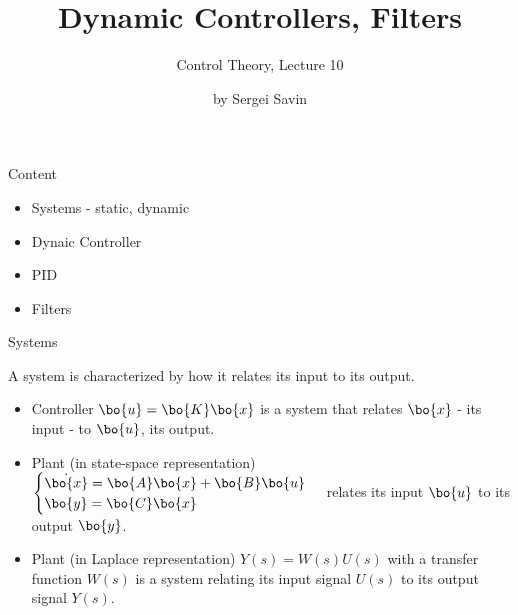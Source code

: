 \documentclass{beamer}
\title{Dynamic Controllers, Filters}
\subtitle{Control Theory, Lecture 10}
\author{by Sergei Savin}
\date{\mydate}
\begin{document}
\maketitle



\begin{frame}{Content}
\begin{itemize}
\item Systems - static, dynamic
\item Dynaic Controller
\item PID
\item Filters
\end{itemize}
\end{frame}




\begin{frame}{Systems}
\begin{flushleft}

A system is characterized by how it relates its input to its output.

\begin{itemize}
	\item Controller $\bo{u} = \bo{K}\bo{x}$ is a system that relates $\bo{x}$ - its input - to $\bo{u}$, its output. 
	
	\item Plant (in state-space representation) 
$\begin{cases}
		\dot {\bo{x}} = \bo{A} \bo{x} + \bo{B} \bo{u} \\
		\bo{y} = \bo{C} \bo{x}
	\end{cases}$ 
relates its input $\bo{u}$ to its output $\bo{y}$.

	\item Plant (in Laplace representation) $Y(s) = W(s)U(s)$ with a transfer function $W(s)$ is a system relating its input signal $U(s)$ to its output signal $Y(s)$.
\end{itemize}

\end{flushleft}
\end{frame}
\end{document}
